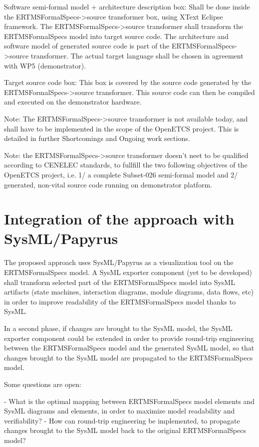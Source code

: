 Software semi-formal model + architecture description box: Shall be done inside the ERTMSFormalSpecs->source transformer box, using XText Eclipse framework.
The ERTMSFormalSpecs->source transformer shall transform the ERTMSFormalSpecs model into target source code. The architecture and software model of generated source code is part of the ERTMSFormalSpecs->source transformer. The actual target language shall be chosen in agreement with WP5 (demonstrator).

Target source code box: This box is covered by the source code generated by the ERTMSFormalSpecs->source transformer. This source code can then be compiled and executed on the demonstrator hardware.

Note: The ERTMSFormalSpecs->source transformer is not available today, and shall have to be implemented in the scope of the OpenETCS project. This is detailed in further Shortcomings and Ongoing work sections.

Note: the ERTMSFormalSpecs->source transformer doesn't neet to be qualified according to CENELEC standards, to fullfill the two following objectives of the OpenETCS project, i.e. 1/ a complete Subset-026 semi-formal model and 2/ generated, non-vital source code running on demonstrator platform. 

\section{Integration of the approach with SysML/Papyrus}

The proposed approach uses SysML/Papyrus as a visualization tool on the ERTMSFormalSpecs model. A SysML exporter component (yet to be developed) shall transform selected part of the ERTMSFormalSpecs model into SysML artifacts (state machines, interaction diagrams, module diagrams, data flows, etc) in order to improve readability of the ERTMSFormalSpecs model thanks to SysML. 

In a second phase, if changes are brought to the SysML model, the SysML exporter component could be extended in order to provide round-trip engineering between the ERTMSFormalSpecs model and the generated SysML model, so that changes brought to the SysML model are propagated to the ERTMSFormalSpecs model.

Some questions are open:

- What is the optimal mapping between ERTMSFormalSpecs model elements and SysML diagrams and elements, in order to maximize model readability and verifiability? 
- How can round-trip engineering be implemented, to propagate changes brought to the SysML model back to the original ERTMSFormalSpecs model?

